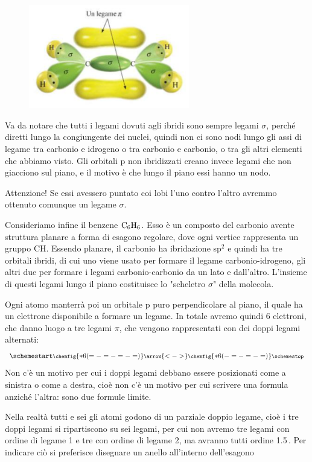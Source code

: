 \begin{figure}[htp]
    \centering
    \includegraphics[width=7cm]{immagini/etene.png}
\end{figure}

Va da notare che tutti i legami dovuti agli ibridi sono sempre legami $\sigma$, perché diretti lungo la congiungente dei nuclei, quindi non ci sono nodi lungo gli assi di legame tra carbonio e idrogeno o tra carbonio e carbonio, o tra gli altri elementi che abbiamo visto. Gli orbitali p non ibridizzati creano invece legami che non giacciono sul piano, e il motivo è che lungo il piano essi hanno un nodo.

Attenzione! Se essi avessero puntato coi lobi l'uno contro l'altro avremmo ottenuto comunque un legame $\sigma$.

\vspace{0.2cm}Consideriamo infine il benzene $\rm C_6H_6$. Esso è un composto del carbonio avente struttura planare a forma di esagono regolare, dove ogni vertice rappresenta un gruppo CH. Essendo planare, il carbonio ha ibridazione sp$^2$ e quindi ha tre orbitali ibridi, di cui uno viene usato per formare il legame carbonio-idrogeno, gli altri due per formare i legami carbonio-carbonio da un lato e dall'altro. L'insieme di questi legami lungo il piano costituisce lo "scheletro $\sigma$" della molecola.

Ogni atomo manterrà poi un orbitale p puro perpendicolare al piano, il quale ha un elettrone disponibile a formare un legame. In totale avremo quindi 6 elettroni, che danno luogo a tre legami $\pi$, che vengono rappresentati con dei doppi legami alternati:
$$
\schemestart
\footnotesize\chemfig{*6(=-=-=-=)}
\arrow{<->}
\footnotesize\chemfig{*6(-=-=-=)}
\schemestop
$$
Non c'è un motivo per cui i doppi legami debbano essere posizionati come a sinistra o come a destra, cioè non c'è un motivo per cui scrivere una formula anziché l'altra: sono due formule limite.

Nella realtà tutti e sei gli atomi godono di un parziale doppio legame, cioè i tre doppi legami si ripartiscono su sei legami, per cui non avremo tre legami con ordine di legame 1 e tre con ordine di legame 2, ma avranno tutti ordine 1.5\,. Per indicare ciò si preferisce disegnare un anello all'interno dell'esagono
  
